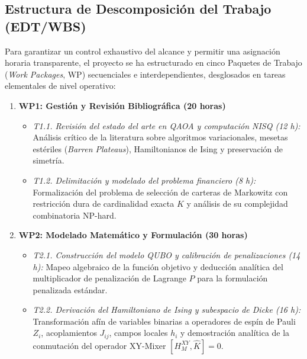\subsection{Estructura de Descomposición del Trabajo (EDT/WBS)}
\label{subsec:edt_wbs}

Para garantizar un control exhaustivo del alcance y permitir una asignación horaria transparente, el proyecto se ha estructurado en cinco Paquetes de Trabajo (\textit{Work Packages}, WP) secuenciales e interdependientes, desglosados en tareas elementales de nivel operativo:

\begin{enumerate}[leftmargin=*]
    \item \textbf{WP1: Gestión y Revisión Bibliográfica (20 horas)}
    \begin{itemize}
        \item \textit{T1.1. Revisión del estado del arte en QAOA y computación NISQ (12 h):} Análisis crítico de la literatura sobre algoritmos variacionales, mesetas estériles (\textit{Barren Plateaus}), Hamiltonianos de Ising y preservación de simetría.
        \item \textit{T1.2. Delimitación y modelado del problema financiero (8 h):} Formalización del problema de selección de carteras de Markowitz con restricción dura de cardinalidad exacta $K$ y análisis de su complejidad combinatoria NP-hard.
    \end{itemize}

    \item \textbf{WP2: Modelado Matemático y Formulación (30 horas)}
    \begin{itemize}
        \item \textit{T2.1. Construcción del modelo QUBO y calibración de penalizaciones (14 h):} Mapeo algebraico de la función objetivo y deducción analítica del multiplicador de penalización de Lagrange $P$ para la formulación penalizada estándar.
        \item \textit{T2.2. Derivación del Hamiltoniano de Ising y subespacio de Dicke (16 h):} Transformación afín de variables binarias a operadores de espín de Pauli $Z_i$, acoplamientos $J_{ij}$, campos locales $h_i$ y demostración analítica de la conmutación del operador XY-Mixer $[H_M^{XY}, \hat{K}] = 0$.
    \end{itemize}


\end{enumerate}
